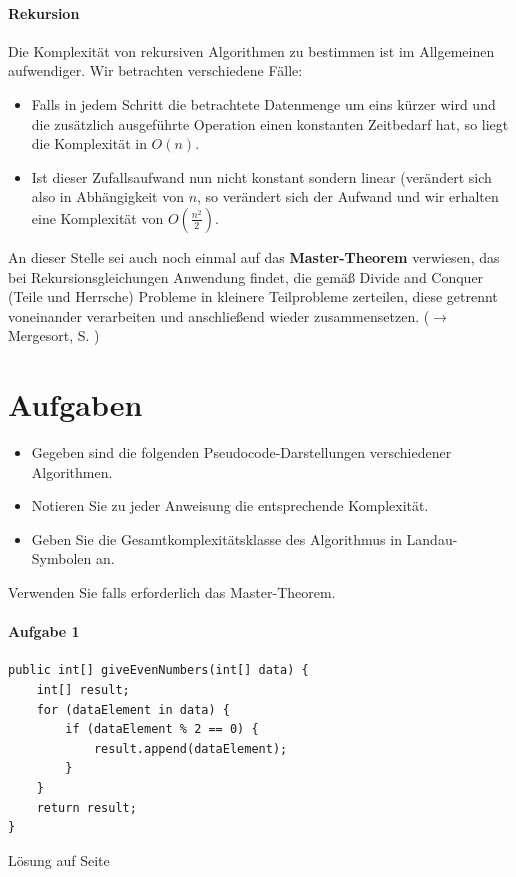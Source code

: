 \documentclass[11pt,a4paper]{scrartcl}
\begin{document}
\paragraph{Rekursion}
Die Komplexität von rekursiven Algorithmen zu bestimmen ist im Allgemeinen aufwendiger. Wir betrachten verschiedene Fälle:
\begin{itemize}
\item Falls in jedem Schritt die betrachtete Datenmenge um eins kürzer wird und die zusätzlich ausgeführte Operation einen konstanten Zeitbedarf hat, so liegt die Komplexität in $O(n)$.
\item Ist dieser Zufallsaufwand nun nicht konstant sondern linear (verändert sich also in Abhängigkeit von $n$, so verändert sich der Aufwand und wir erhalten eine Komplexität von $O(\frac{n^2}{2})$.
\end{itemize}
An dieser Stelle sei auch noch einmal auf das \textbf{Master-Theorem} verwiesen, das bei Rekursionsgleichungen Anwendung findet, die gemäß {\glqq}Divide and Conquer{\grqq} (Teile und Herrsche) Probleme in kleinere Teilprobleme zerteilen, diese getrennt voneinander verarbeiten und anschließend wieder zusammensetzen. ($\to$ Mergesort, S.  \pageref{mergesort})
\vspace{1cm}
\section*{Aufgaben}
\begin{itemize}
\item Gegeben sind die folgenden Pseudocode-Darstellungen verschiedener Algorithmen. 
\item Notieren Sie zu jeder Anweisung die entsprechende Komplexität.
\item Geben Sie die Gesamtkomplexitätsklasse des Algorithmus in Landau-Symbolen an.
\end{itemize}
Verwenden Sie falls erforderlich das Master-Theorem.
\paragraph{Aufgabe 1} \quad
\begin{lstlisting}
public int[] giveEvenNumbers(int[] data) {
	int[] result;
	for (dataElement in data) {
		if (dataElement % 2 == 0) {
			result.append(dataElement);		
		}	
	}
	return result;
}
\end{lstlisting}
\begin{flushright}
Lösung auf Seite \pageref{a1.5:lsg}
\end{flushright}
\end{document}
